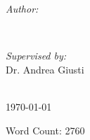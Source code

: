 \begin{titlepage}
\begin{minipage}{0.4\textwidth}
\begin{flushleft} \large
\emph{Author:}\\
\@author %
\end{flushleft}
\end{minipage}\\[1cm]


\begin{minipage}{0.4\textwidth}
\begin{flushleft} \large
\emph{Supervised by:} \\
Dr. Andrea Giusti \\[1.2em] %
\end{flushleft}
\end{minipage}\\[2cm]
\makeatother %
{\large \today}\\[2cm] %
\vspace*{\fill}
\begin{minipage}{0.4\textwidth}
\centering
Word Count: 2760
\end{minipage}\\




\vfill %

\end{titlepage}